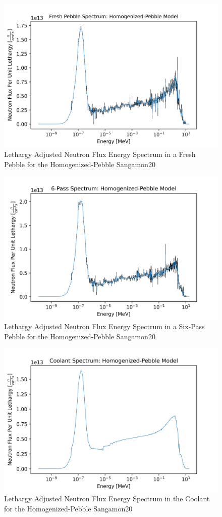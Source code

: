 
\begin{figure}[H]
\centering
  \includegraphics[width=0.95\linewidth]{figures/fresh_spec_homog_v2}
  \caption{Lethargy Adjusted Neutron Flux Energy Spectrum in a Fresh Pebble for the Homogenized-Pebble Sangamon20}
  \label{fig:hom-fresh}
\end{figure}

\begin{figure}[H]
\centering
  \includegraphics[width=0.95\linewidth]{figures/6_spec_homog_v2}
  \caption{Lethargy Adjusted Neutron Flux Energy Spectrum in a Six-Pass Pebble for the Homogenized-Pebble Sangamon20}
  \label{fig:hom-six}
\end{figure}

\begin{figure}[H]
\centering
  \includegraphics[width=0.95\linewidth]{figures/cool_spec_homog_v2}
  \caption{Lethargy Adjusted Neutron Flux Energy Spectrum in the Coolant for the Homogenized-Pebble Sangamon20}
  \label{fig:hom-cool}
\end{figure}
